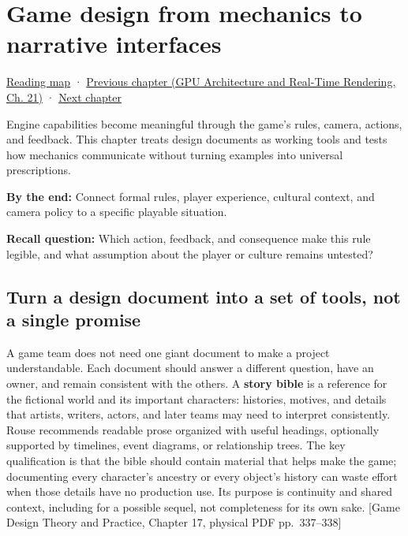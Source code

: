 \chapter{Game design from mechanics to narrative interfaces}\label{06-engine-ii-ch046-game-design-from-mechanics-to-narrative-interfaces}\hypertarget{06-engine-ii-ch046}{}\label{stagechapter:06-engine-ii-ch046}

\hyperref[volume-reading-map]{Reading map} · \href{../06-GPU-Architecture-and-Real-Time-Rendering/main.pdf\#nameddest=06-engine-ii-ch045-rasterizing-kernels-and-connecting-world-identity}{Previous chapter (GPU Architecture and Real-Time Rendering, Ch. 21)} · \hyperref[06-engine-ii-ch047-narrative-simulation-and-ai-in-playable-worlds]{Next chapter}

Engine capabilities become meaningful through the game's rules, camera, actions, and feedback. This chapter treats design documents as working tools and tests how mechanics communicate without turning examples into universal prescriptions.

\textbf{By the end:} Connect formal rules, player experience, cultural context, and camera policy to a specific playable situation.

\textbf{Recall question:} Which action, feedback, and consequence make this rule legible, and what assumption about the player or culture remains untested?

\section{Turn a design document into a set of tools, not a single promise}\label{06-engine-ii-ch046-turn-a-design-document-into-a-set-of-tools-not-a-single-promise}

A game team does not need one giant document to make a project understandable. Each document should answer a different question, have an owner, and remain consistent with the others. A \textbf{story bible} is a reference for the fictional world and its important characters: histories, motives, and details that artists, writers, actors, and later teams may need to interpret consistently. Rouse recommends readable prose organized with useful headings, optionally supported by timelines, event diagrams, or relationship trees. The key qualification is that the bible should contain material that helps make the game; documenting every character's ancestry or every object's history can waste effort when those details have no production use. Its purpose is continuity and shared context, including for a possible sequel, not completeness for its own sake. {[}Game Design Theory and Practice, Chapter 17, physical PDF pp.~337--338{]}

